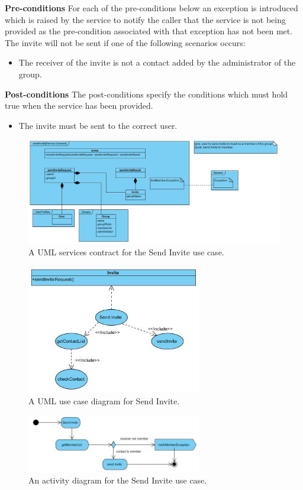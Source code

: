\documentclass[11pt]{article}
\begin{document}
\textbf{Pre-conditions} \newline
 For each of the pre-conditions below an exception is introduced which is raised by the service to notify the caller that the service is not being provided as the pre-condition associated with that exception has not been met.\newline
 The invite will not be sent if one of the following scenarios occurs:
 \begin{itemize}
 \item	The receiver of the invite is not a contact added by the administrator of the group.
 \end{itemize}
\textbf{Post-conditions} \newline
 The post-conditions specify the conditions which must hold true when the service has been provided.
 \begin{itemize}
\item	The invite must be sent to the correct user.
\end{itemize}
\begin{figure}[H]
\centering
\includegraphics[width=5in]{./images/serviceContract-sendInvite.jpg}
\caption[Send Invite Services Contract]{A UML services contract for the Send Invite use case.}
\label{SC-figure-send-invite}
\end{figure}
\begin{figure}[H]
\centering
\includegraphics[width=3in]{./images/FR-sendInvite.jpg}
\caption[Send Invite Use Case Diagram]{A UML use case diagram for Send Invite.}
\end{figure}
\begin{figure}[H]
\centering
\includegraphics[width=3in]{./images/process-sendInvite.jpg}
\caption[Send Invite Activity Diagram]{An activity diagram for the Send Invite use case.}
\label{FR-figure-send-invite}
\end{figure}
\end{document}
